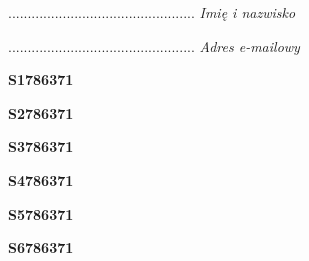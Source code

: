 \begin{turn}{90}\begin{minipage}{\linewidth} \vspace{20mm} ................................................  \textit{Imię i nazwisko}\end{minipage}\end{turn}

\begin{turn}{90}\begin{minipage}{\linewidth} \vspace{20mm} ................................................  \textit{Adres e-mailowy}\end{minipage}\end{turn}

\begin{turn}{90}\huge \begin{minipage}{\linewidth} \vspace{10mm}\textbf{S1786371}\end{minipage}\end{turn}

\begin{turn}{90}\huge \begin{minipage}{\linewidth} \vspace{10mm}\textbf{S2786371}\end{minipage}\end{turn}

\begin{turn}{90}\huge \begin{minipage}{\linewidth} \vspace{10mm}\textbf{S3786371}\end{minipage}\end{turn}

\begin{turn}{90}\huge \begin{minipage}{\linewidth} \vspace{10mm}\textbf{S4786371}\end{minipage}\end{turn}

\begin{turn}{90}\huge \begin{minipage}{\linewidth} \vspace{10mm}\textbf{S5786371}\end{minipage}\end{turn}

\begin{turn}{90}\huge \begin{minipage}{\linewidth} \vspace{10mm}\textbf{S6786371}\end{minipage}\end{turn}

